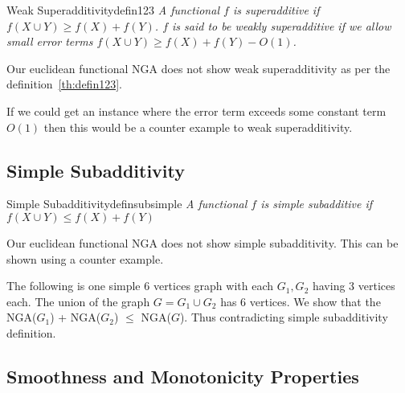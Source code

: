 \documentclass{article}
\begin{document}
\begin{define}{Weak Superadditivity}{defin123}
    \textit{A functional $f$ is superadditive if $f(X \cup Y) \ge f(X) + f(Y) $.
        $f$ is said to be weakly superadditive if we allow small error terms
        $f(X \cup Y) \ge f(X) + f(Y) - O(1)$.}
\end{define}

Our euclidean functional \textsf{NGA} does not show weak superadditivity as per the definition~\ref{th:defin123}.

If we could get an instance where the error term exceeds some constant term $O(1)$
then this would be a counter example to weak superadditivity.




\subsection{Simple Subadditivity}
\begin{define}{Simple Subadditivity}{definsubsimple}
    \textit{A functional $f$ is simple subadditive if $f(X \cup Y) \leq f(X) + f(Y)$}
\end{define}

Our euclidean functional \textsf{NGA} does not show simple subadditivity. This
can be shown using a counter example.

The following is one simple $6$ vertices graph with each $G_1, G_2$ having 3
vertices each. The union of the graph $G = G_1 \cup G_2$ has $6$ vertices. We
show that the \textsf{NGA}($G_1$) + \textsf{NGA}($G_2$) $\leq$
\textsf{NGA}($G$). Thus contradicting simple subadditivity definition.



\subsection{Smoothness and Monotonicity Properties}
\end{document}
